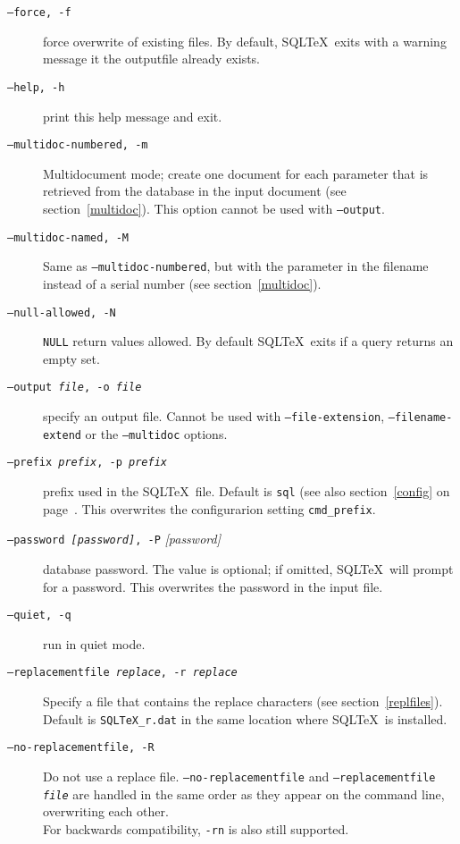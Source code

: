 \documentclass{article}
\begin{document}
\begin{description}
\item[\texttt{--force, -f}] force overwrite of existing files. By default, SQL\TeX\ exits with a
warning message it the outputfile already exists.

\item[\texttt{--help, -h}] print this help message and exit.

\item[\texttt{--multidoc-numbered, -m}] Multidocument mode; create one document for each parameter that is retrieved
from the database in the input document (see section~\ref{multidoc}). This option cannot be used with \texttt{--output}.

\item[\texttt{--multidoc-named, -M}] Same as \texttt{--multidoc-numbered}, but with the parameter in the filename instead of a serial number (see section~\ref{multidoc}).

\item[\texttt{--null-allowed, -N}] \texttt{NULL} return values allowed. By default SQL\TeX\ exits if a
query returns an empty set.

\item[\texttt{--output \textit{file}, -o \textit{file}}] specify an output file. Cannot be used with \texttt{--file-extension},
\texttt{--filename-extend} or the  \texttt{--multidoc} options.

\item[\texttt{--prefix \textit{prefix}, -p \textit{prefix}}] prefix used in the SQL\TeX\ file. Default is \texttt{sql} (see also section~\ref{config}
on page~\pageref{prefix}. This overwrites the configurarion setting \texttt{cmd\_prefix}.

\item[\texttt{--password \textit{[password]}, -P} \textit{[password]}] database password. The value is optional; if omitted, SQL\TeX\ will prompt for a password. This overwrites the password in the input file.\\

\item[\texttt{--quiet, -q}] run in quiet mode.

\item[\texttt{--replacementfile \textit{replace}, -r \textit{replace}}] Specify a file that contains the replace characters (see section~\ref{replfiles}). \\
Default is \texttt{SQLTeX{\_}r.dat} in the same location where SQL\TeX\ is installed.

\item[\texttt{--no-replacementfile, -R}] Do not use a replace file. \texttt{--no-replacementfile} and \texttt{--replacementfile \textit{file}} are handled in the same order as
they appear on the command line, overwriting each other.\\
For backwards compatibility, \texttt{-rn} is also still supported.


\end{description}
\end{document}
